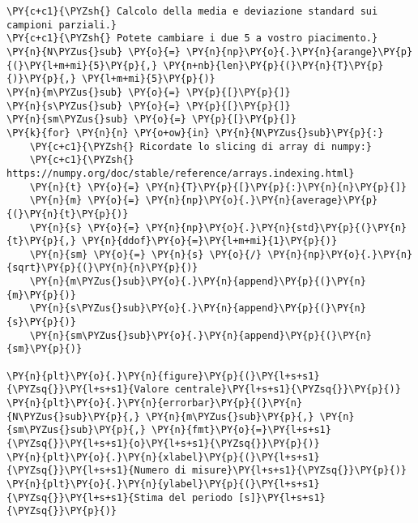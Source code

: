 \begin{Verbatim}[label=\makebox{\href{https://github.com/unipi-physics-labs/lab1-sheets/tree/main/snippy/dad_errore_statistico.py}{https://github.com/.../dad\_errore\_statistico.py}},commandchars=\\\{\}]
\PY{c+c1}{\PYZsh{} Calcolo della media e deviazione standard sui campioni parziali.}
\PY{c+c1}{\PYZsh{} Potete cambiare i due 5 a vostro piacimento.}
\PY{n}{N\PYZus{}sub} \PY{o}{=} \PY{n}{np}\PY{o}{.}\PY{n}{arange}\PY{p}{(}\PY{l+m+mi}{5}\PY{p}{,} \PY{n+nb}{len}\PY{p}{(}\PY{n}{T}\PY{p}{)}\PY{p}{,} \PY{l+m+mi}{5}\PY{p}{)}
\PY{n}{m\PYZus{}sub} \PY{o}{=} \PY{p}{[}\PY{p}{]}
\PY{n}{s\PYZus{}sub} \PY{o}{=} \PY{p}{[}\PY{p}{]}
\PY{n}{sm\PYZus{}sub} \PY{o}{=} \PY{p}{[}\PY{p}{]}
\PY{k}{for} \PY{n}{n} \PY{o+ow}{in} \PY{n}{N\PYZus{}sub}\PY{p}{:}
    \PY{c+c1}{\PYZsh{} Ricordate lo slicing di array di numpy:}
    \PY{c+c1}{\PYZsh{} https://numpy.org/doc/stable/reference/arrays.indexing.html}
    \PY{n}{t} \PY{o}{=} \PY{n}{T}\PY{p}{[}\PY{p}{:}\PY{n}{n}\PY{p}{]}
    \PY{n}{m} \PY{o}{=} \PY{n}{np}\PY{o}{.}\PY{n}{average}\PY{p}{(}\PY{n}{t}\PY{p}{)}
    \PY{n}{s} \PY{o}{=} \PY{n}{np}\PY{o}{.}\PY{n}{std}\PY{p}{(}\PY{n}{t}\PY{p}{,} \PY{n}{ddof}\PY{o}{=}\PY{l+m+mi}{1}\PY{p}{)}
    \PY{n}{sm} \PY{o}{=} \PY{n}{s} \PY{o}{/} \PY{n}{np}\PY{o}{.}\PY{n}{sqrt}\PY{p}{(}\PY{n}{n}\PY{p}{)}
    \PY{n}{m\PYZus{}sub}\PY{o}{.}\PY{n}{append}\PY{p}{(}\PY{n}{m}\PY{p}{)}
    \PY{n}{s\PYZus{}sub}\PY{o}{.}\PY{n}{append}\PY{p}{(}\PY{n}{s}\PY{p}{)}
    \PY{n}{sm\PYZus{}sub}\PY{o}{.}\PY{n}{append}\PY{p}{(}\PY{n}{sm}\PY{p}{)}

\PY{n}{plt}\PY{o}{.}\PY{n}{figure}\PY{p}{(}\PY{l+s+s1}{\PYZsq{}}\PY{l+s+s1}{Valore centrale}\PY{l+s+s1}{\PYZsq{}}\PY{p}{)}
\PY{n}{plt}\PY{o}{.}\PY{n}{errorbar}\PY{p}{(}\PY{n}{N\PYZus{}sub}\PY{p}{,} \PY{n}{m\PYZus{}sub}\PY{p}{,} \PY{n}{sm\PYZus{}sub}\PY{p}{,} \PY{n}{fmt}\PY{o}{=}\PY{l+s+s1}{\PYZsq{}}\PY{l+s+s1}{o}\PY{l+s+s1}{\PYZsq{}}\PY{p}{)}
\PY{n}{plt}\PY{o}{.}\PY{n}{xlabel}\PY{p}{(}\PY{l+s+s1}{\PYZsq{}}\PY{l+s+s1}{Numero di misure}\PY{l+s+s1}{\PYZsq{}}\PY{p}{)}
\PY{n}{plt}\PY{o}{.}\PY{n}{ylabel}\PY{p}{(}\PY{l+s+s1}{\PYZsq{}}\PY{l+s+s1}{Stima del periodo [s]}\PY{l+s+s1}{\PYZsq{}}\PY{p}{)}


\end{Verbatim}
